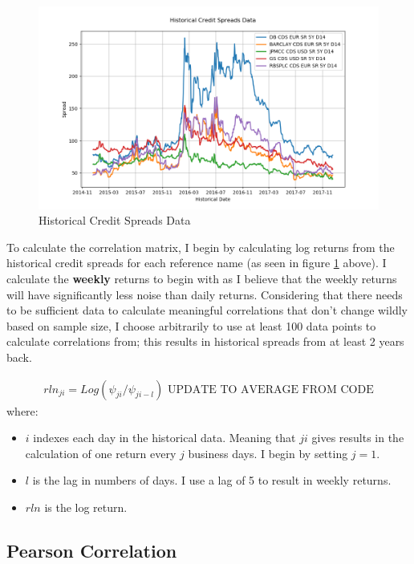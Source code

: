 \documentclass{report}
\theoremstyle{plain}
\theoremstyle{definition}
\begin{document}
\begin{figure}[H]
	\begin{center}
		\includegraphics[width=15cm]{Historical_Credit_Spreads_Data.png}
		\caption{Historical Credit Spreads Data} 
		\label{Historical_Credit_Spreads_Data}
	\end{center}
\end{figure}

To calculate the correlation matrix, I begin by calculating log returns from the historical credit spreads for each reference name (as seen in figure \ref{Historical_Credit_Spreads_Data} above). I calculate the \textbf{weekly} returns to begin with as I believe that the weekly returns will have significantly less noise than daily returns. Considering that there needs to be sufficient data to calculate meaningful correlations that don't change wildly based on sample size, I choose arbitrarily to use at least 100 data points to calculate correlations from; this results in historical spreads from at least 2 years back. 

\begin{align*}
rln_{ji} = Log(\psi_{ji} / \psi_{ji - l}) \text{ UPDATE TO AVERAGE FROM CODE}
\end{align*}
where:
\begin{itemize}
	\item $i$ indexes each day in the historical data. Meaning that $ji$ gives results in the calculation of one return every $j$ business days. I begin by setting $j = 1$.
	\item $l$ is the lag in numbers of days. I use a lag of 5 to result in weekly returns.
	\item $rln$ is the log return.
\end{itemize}

\subsection{Pearson Correlation}
\end{document}
